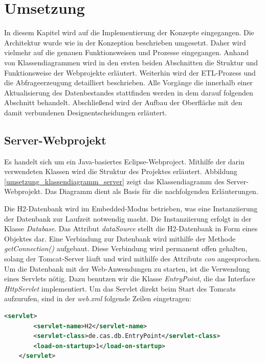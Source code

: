 

\chapter{Umsetzung}
\label{ch:umsetzung}

In diesem Kapitel wird auf die Implementierung der Konzepte eingegangen. Die Architektur wurde wie in der Konzeption beschrieben umgesetzt. Daher wird vielmehr auf die genauen Funktionsweisen und Prozesse eingegangen. Anhand von Klassendiagrammen wird in den ersten beiden Abschnitten die Struktur und Funktionsweise der Webprojekte erläutert. Weiterhin wird der ETL-Prozess und die Abfrageerzeugung detailliert beschrieben. Alle Vorgänge die innerhalb einer Aktualisierung des Datenbestandes stattfinden werden in dem darauf folgenden Abschnitt behandelt. Abschließend wird der Aufbau der Oberfläche mit den damit verbundenen Designentscheidungen erläutert. 

\section{Server-Webprojekt}

Es handelt sich um ein Java-basiertes Eclipse-Webproject. Mithilfe der darin verwendeten Klassen wird die Struktur des Projektes erläutert. Abbildung \ref{umsetzung_klassendiagramm_server} zeigt das Klassendiagramm des Server-Webprojekt. Das Diagramm dient als Basis für die nachfolgenden Erläuterungen. 

Die H2-Datenbank wird im Embedded-Modus betrieben, was eine Instanziierung der Datenbank zur Laufzeit notwendig macht. Die Instanziierung erfolgt in der Klasse \textit{Database}. Das Attribut \textit{dataSource} stellt die H2-Datenbank in Form eines Objektes dar. Eine Verbindung zur Datenbank wird mithilfe der Methode \textit{getConnection()} aufgebaut. Diese Verbindung wird permanent offen gehalten, solang der Tomcat-Server läuft und wird mithilfe des Attributs \textit{con} angesprochen. Um die Datenbank mit der Web-Anwendungen zu starten, ist die Verwendung eines Servlets nötig. Dazu benutzen wir die Klasse \textit{EntryPoint}, die das Interface \textit{HttpServlet} implementiert. Um das Servlet direkt beim Start des Tomcats aufzurufen, sind in der \textit{web.xml} folgende Zeilen eingetragen: 

\begin{lstlisting}[language=XML]
	<servlet>
		<servlet-name>H2</servlet-name>
		<servlet-class>de.cas.db.EntryPoint</servlet-class>
		<load-on-startup>1</load-on-startup>
	</servlet>
\end{lstlisting}

